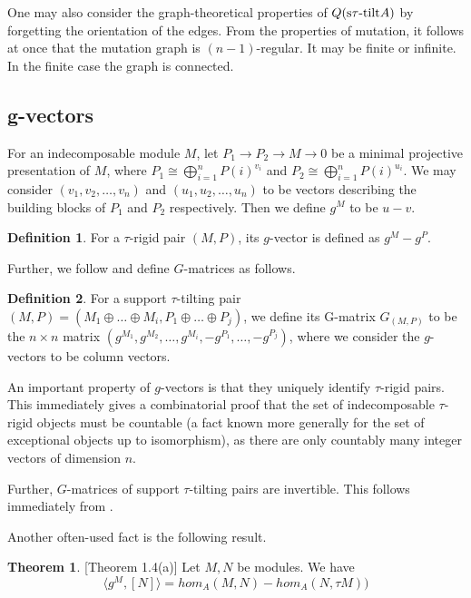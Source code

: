 \documentclass[]{article}
\theoremstyle{definition}
\newtheorem{definition}{Definition}[section]
\newtheorem{theorem}{Theorem}[section]
\newcommand{\tu}{\ensuremath{\tau}}
\begin{document}
One may also consider the graph-theoretical properties of $Q(\text{s\tu-tilt} A)$ by forgetting the orientation of the edges. From the properties of mutation, it follows at once that the mutation graph is $(n-1)$-regular. It may be finite or infinite. In the finite case the graph is connected\cite[Corollary 3.10]{tau}.

\subsection{g-vectors}
For an indecomposable module $M$, let $P_1 \to P_2 \to M \to 0$ be a minimal projective presentation of $M$, where $P_1 \cong \bigoplus_{i = 1}^n P(i)^{v_i}$ and $P_2 \cong \bigoplus_{i = 1}^n P(i)^{u_i}$. We may consider $(v_1,v_2,\dots,v_n)$ and $(u_1,u_2,\dots,u_n)$ to be vectors describing the building blocks of $P_1$ and $P_2$ respectively. Then we define $g^M$ to be $u - v$. 

\begin{definition}
	For a $\tau$-rigid pair $(M,P)$, its $g$-vector is defined as $g^M - g^P$. 
\end{definition}

Further, we follow \cite{schroll2020tautilting} and define $G$-matrices as follows.

\begin{definition}\cite[Definition 2.4]{schroll2020tautilting}
	For a support \tu-tilting pair $(M,P) = (M_1 \oplus \dots \oplus M_i,P_1 \oplus \dots \oplus P_j)$, we define its G-matrix $G_{(M,P)}$ to be the $n \times n$ matrix $(g^{M_1},g^{M_2},\dots,g^{M_i},-g^{P_1},\dots,-g^{P_j})$, where we consider the $g$-vectors to be column vectors.
	
\end{definition} 

An important property of $g$-vectors is that they uniquely identify $\tau$-rigid pairs\cite[Theorem 5.5]{tau}. This immediately gives a combinatorial proof that the set of indecomposable \tu-rigid objects must be countable (a fact known more generally for the set of exceptional objects up to isomorphism), as there are only countably many integer vectors of dimension $n$. 

Further, $G$-matrices of support \tu-tilting pairs are invertible. This follows immediately from \cite[Theorem 5.1]{tau}.

Another often-used fact is the following result.

\begin{theorem}\cite{auslander1985modules}[Theorem 1.4(a)]
	Let $M,N$ be modules. We have \[\langle g^M,[N]\rangle = hom_A(M,N) - hom_A(N,\tau M))\]
\end{theorem}
\end{document}

